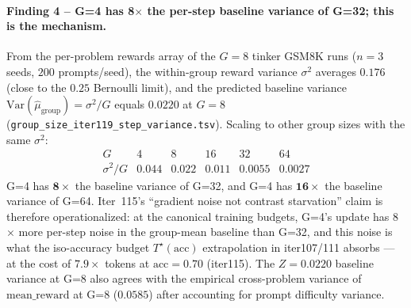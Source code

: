 \paragraph{Finding 4 -- G=4 has 8$\times$ the per-step baseline
variance of G=32; this is the mechanism.}
From the per-problem rewards array of the $G{=}8$ tinker GSM8K runs
($n{=}3$ seeds, $200$ prompts/seed), the within-group reward variance
$\sigma^2$ averages $0.176$ (close to the $0.25$ Bernoulli limit),
and the predicted baseline variance $\mathrm{Var}(\hat\mu_{\mathrm{group}}){=}\sigma^2/G$
equals $0.0220$ at $G{=}8$
(\texttt{group\_size\_iter119\_step\_variance.tsv}).  Scaling to
other group sizes with the same $\sigma^2$:
\[
\begin{array}{lccccc}
G & 4 & 8 & 16 & 32 & 64 \\
\sigma^2/G & 0.044 & 0.022 & 0.011 & 0.0055 & 0.0027
\end{array}
\]
G=4 has $\mathbf{8\times}$ the baseline variance of G=32, and G=4 has
$\mathbf{16\times}$ the baseline variance of G=64.  Iter~115's
``gradient noise not contrast starvation'' claim is therefore
operationalized: at the canonical training budgets, G=4's update has
8$\times$ more per-step noise in the group-mean baseline than G=32,
and this noise is what the iso-accuracy budget $T^\star(\mathrm{acc})$
extrapolation in iter107/111 absorbs --- at the cost of $7.9{\times}$
tokens at $\mathrm{acc}{=}0.70$ (iter115).  The
$Z{=}0.0220$ baseline variance at G=8 also agrees with the empirical
cross-problem variance of $\mathrm{mean\_reward}$ at G=8 ($0.0585$)
after accounting for prompt difficulty variance.

